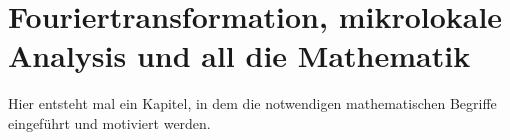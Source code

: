 
\section{Fouriertransformation, mikrolokale Analysis und all die Mathematik} %
\label{sec:fouriertransformation_mikrolokale_analysis_und_all_die_mathematik}

Hier entsteht mal ein Kapitel, in dem die notwendigen mathematischen Begriffe eingeführt und motiviert werden.

